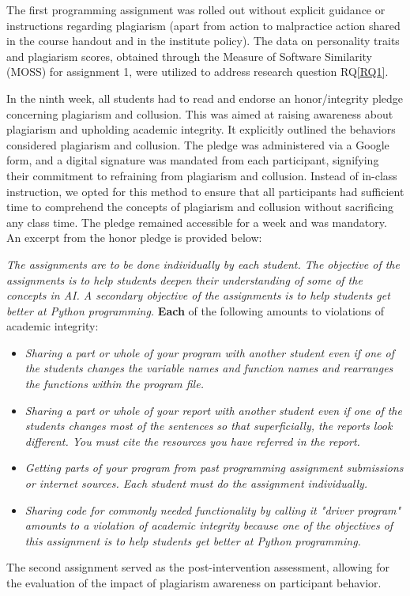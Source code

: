 The first programming assignment was rolled out without explicit guidance or instructions regarding plagiarism (apart from action to malpractice action shared in the course handout and in the institute policy). The data on personality traits and plagiarism scores, obtained through the Measure of Software Similarity (MOSS) for assignment 1, were utilized to address research question RQ\ref{RQ1}.

In the ninth week, all students had to read and endorse an honor/integrity pledge concerning plagiarism and collusion. This was aimed at raising awareness about plagiarism and upholding academic integrity. It explicitly outlined the behaviors considered plagiarism and collusion. The pledge was administered via a Google form, and a digital signature was mandated from each participant, signifying their commitment to refraining from plagiarism and collusion. Instead of in-class instruction, we opted for this method to ensure that all participants had sufficient time to comprehend the concepts of plagiarism and collusion without sacrificing any class time. The pledge remained accessible for a week and was mandatory. An excerpt from the honor pledge is provided below:

\begin{myquote}
    \textit{The assignments are to be done individually by each student. The objective of the assignments is to help students deepen their understanding of some of the concepts in AI. A secondary objective of the assignments is to help students get better at Python programming.}
    \textbf{Each} of the following amounts to violations of academic integrity:
    \begin{itemize}
        \item \textit{Sharing a part or whole of your program with another student even if one of the students changes the variable names and function names and rearranges the functions within the program file.}
        \item \textit{Sharing a part or whole of your report with another student even if one of the students changes most of the sentences so that superficially, the reports look different. You must cite the resources you have referred in the report.} 
        \item \textit{Getting parts of your program from past programming assignment submissions or internet sources. Each student must do the assignment individually.}
        \item \textit{Sharing code for commonly needed functionality by calling it "driver program" amounts to a violation of academic integrity because one of the objectives of this assignment is to help students get better at Python programming. }
    \end{itemize}
\end{myquote}
The second assignment served as the post-intervention assessment, allowing for the evaluation of the impact of plagiarism awareness on participant behavior.

